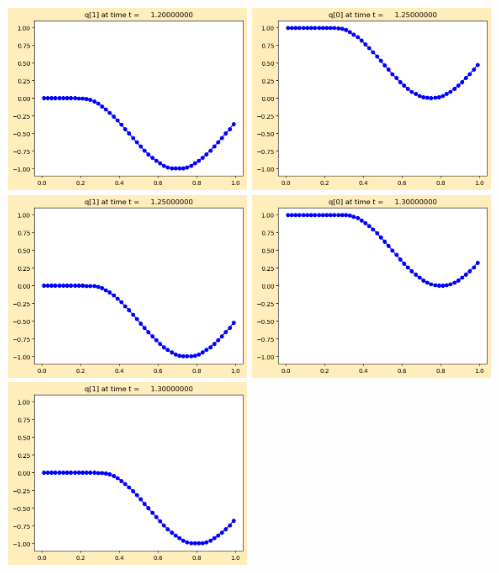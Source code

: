 \documentclass[11pt]{article}
\begin{document}
\includegraphics[width=0.475\textwidth]{frame0024fig1.png}
\vskip 10pt 
\includegraphics[width=0.475\textwidth]{frame0025fig0.png}
\includegraphics[width=0.475\textwidth]{frame0025fig1.png}
\vskip 10pt 
\includegraphics[width=0.475\textwidth]{frame0026fig0.png}
\includegraphics[width=0.475\textwidth]{frame0026fig1.png}
\end{document}
